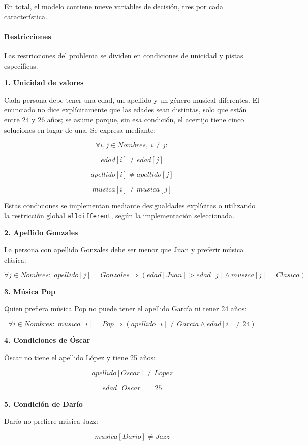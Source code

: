En total, el modelo contiene nueve variables de decisión, tres por cada característica.

\paragraph{Restricciones}

Las restricciones del problema se dividen en condiciones de unicidad y pistas específicas.

\textbf{1. Unicidad de valores}

Cada persona debe tener una edad, un apellido y un género musical diferentes. El enunciado no dice explícitamente que las edades sean distintas, solo que están entre 24 y 26 años; se asume porque, sin esa condición, el acertijo tiene cinco soluciones en lugar de una. Se expresa mediante:

\[
\forall i,j \in Nombres,\ i \neq j:
\]

\[
edad[i] \neq edad[j]
\]

\[
apellido[i] \neq apellido[j]
\]

\[
musica[i] \neq musica[j]
\]

Estas condiciones se implementan mediante desigualdades explícitas o utilizando la restricción global \texttt{alldifferent}, según la implementación seleccionada.

\textbf{2. Apellido Gonzales}

La persona con apellido Gonzales debe ser menor que Juan y preferir música clásica:

\[
\forall j \in Nombres:\;
apellido[j] = Gonzales
\Rightarrow
\left(
edad[Juan] > edad[j]
\land
musica[j] = Clasica
\right)
\]

\textbf{3. Música Pop}

Quien prefiera música Pop no puede tener el apellido García ni tener 24 años:

\[
\forall i \in Nombres:\;
musica[i] = Pop
\Rightarrow
\left(
apellido[i] \neq Garcia
\land
edad[i] \neq 24
\right)
\]

\textbf{4. Condiciones de Óscar}

Óscar no tiene el apellido López y tiene 25 años:

\[
apellido[Oscar] \neq Lopez
\]

\[
edad[Oscar] = 25
\]

\textbf{5. Condición de Darío}

Darío no prefiere música Jazz:

\[
musica[Dario] \neq Jazz
\]

